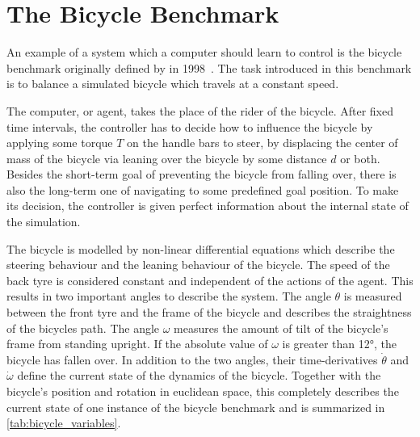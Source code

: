 \chapter{The Bicycle Benchmark}
\label{cha:the_bicycle_benchmark}
An example of a system which a computer should learn to control is the bicycle benchmark originally defined by \citeauthor{randlov_learning_1998} in 1998~\cite{randlov_learning_1998}.
The task introduced in this benchmark is to balance a simulated bicycle which travels at a constant speed.

The computer, or agent, takes the place of the rider of the bicycle.
After fixed time intervals, the controller has to decide how to influence the bicycle by applying some torque $T$ on the handle bars to steer, by displacing the center of mass of the bicycle via leaning over the bicycle by some distance $d$ or both.
Besides the short-term goal of preventing the bicycle from falling over, there is also the long-term one of navigating to some predefined goal position.
To make its decision, the controller is given perfect information about the internal state of the simulation.

The bicycle is modelled by non-linear differential equations which describe the steering behaviour and the leaning behaviour of the bicycle.
The speed of the back tyre is considered constant and independent of the actions of the agent.
This results in two important angles to describe the system.
The angle $\theta$ is measured between the front tyre and the frame of the bicycle and describes the straightness of the bicycles path.
The angle $\omega$ measures the amount of tilt of the bicycle's frame from standing upright.
If the absolute value of $\omega$ is greater than \ang{12}, the bicycle has fallen over.
In addition to the two angles, their time-derivatives $\dot{\theta}$ and $\dot{\omega}$ define the current state of the dynamics of the bicycle.
Together with the bicycle's position and rotation in euclidean space, this completely describes the current state of one instance of the bicycle benchmark and is summarized in \cref{tab:bicycle_variables}.

